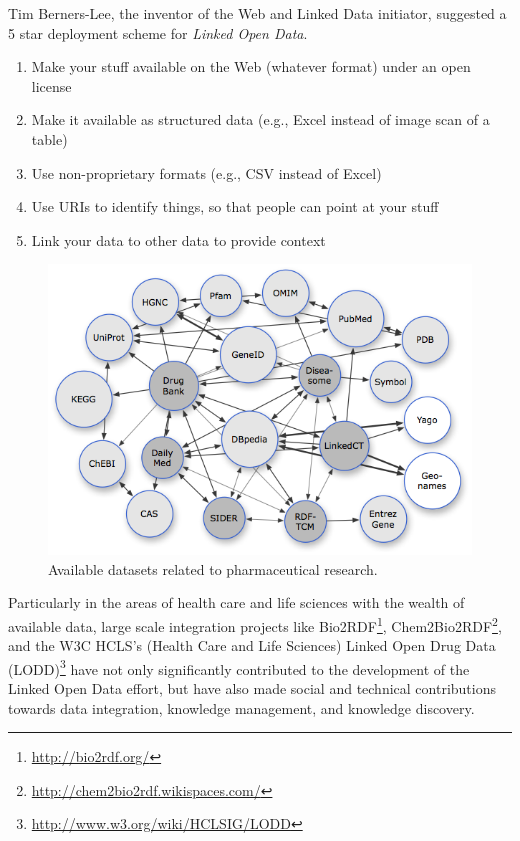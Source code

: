 \documentclass[10pt, conference, compsocconf]{IEEEtran}
\begin{document}
Tim Berners-Lee, the inventor of the Web and Linked Data initiator, suggested a 5 star deployment scheme for \emph{Linked Open Data}.

\begin{enumerate}
  \item  Make your stuff available on the Web (whatever format) under an open license
  \item  Make it available as structured data (e.g., Excel instead of image scan of a table)
  \item  Use non-proprietary formats (e.g., CSV instead of Excel)
  \item  Use URIs to identify things, so that people can point at your stuff
  \item  Link your data to other data to provide context
\end{enumerate}

\begin{figure}[tb]
	\centering
		\includegraphics[width=1.0\columnwidth]{images/lod_cloud.png}
	\caption{Available datasets related to pharmaceutical research.}
	\label{fig:lod}
\end{figure}

Particularly in the areas of health care and life sciences with the wealth of available data, large scale integration projects like Bio2RDF\footnote{\url{http://bio2rdf.org/}}, Chem2Bio2RDF\footnote{\url{http://chem2bio2rdf.wikispaces.com/}}, and the W3C HCLS’s (Health Care and Life Sciences) Linked Open Drug Data (LODD)\footnote{\url{http://www.w3.org/wiki/HCLSIG/LODD}} have not only significantly contributed to the development of the Linked Open Data effort, but have also made social and technical contributions towards data integration, knowledge management, and knowledge discovery.
\end{document}
